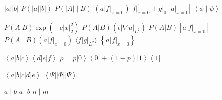 \documentclass{article}
\begin{document}
$\left|a\right|\left|b\right|$ $P\left(\left|a\right|\left|b\right|\right)$ $P\left(\left|A\right|\middle|B\right)$
$\left(a\left|f\right|_{x=0}\right)$ $\left.f\right|_{x=0}^{1}+\left.g\right|_{0}$ $\left|\left.a\right|_{x=0}\right|$
$\left\langle\phi\middle|\psi\right\rangle$

$P(A|B)\exp\left(-c\left|x\right|_{2}^{2}\right)$ $P(A|B)\left(\epsilon\left|\nabla u\right|_{L^{2}}\right)$
$P(A|B)\left[a\left|f\right|_{x=0}\right]$ $P\left(A\middle|B\right)\left(a\left|f\right|_{x=0}\right)$
$\langle f\left|g\right|_{L^{2}}\rangle$
$\left\{a\left|f\right|_{x=0}\right\}$

$\left\langle a\right|b\left|c\right\rangle\left\langle d\right|e\left|f\right\rangle$
$\rho=p\left|0\right\rangle\left\langle 0\right|+(1-p)\left|1\right\rangle\left\langle 1\right|$

$\left\langle a\right|b\left|c\right|d\left|e\right\rangle$ $\left\langle\Psi\right|\left|\Phi\right|\left|\Psi\right\rangle$

$a\mid b$ $a\,\big|\,b$ $n\mid m$
\end{document}
